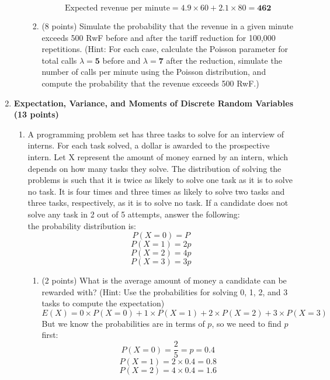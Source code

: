 \documentclass[a3paper,12pt]{article} %
\begin{document}
\begin{enumerate}
\begin{enumerate}
\begin{enumerate}
            \[
                \text{Expected revenue per minute} = 4.9 \times 60 + 2.1 \times 80 = \textbf{462}
            \]
            \item (8 points) Simulate the probability that the revenue in a given minute exceeds 500 RwF before and after the tariff reduction for 100,000 repetitions. (Hint: For each case, calculate the Poisson parameter for total calls \( \lambda = \textbf{5}\) before and \( \lambda = \textbf{7}\) after the reduction, simulate the number of calls per minute using the Poisson distribution, and compute the probability that the revenue exceeds 500 RwF.)
        \end{enumerate}
    \end{enumerate}
    \newpage
    \item \textbf{Expectation, Variance, and Moments of Discrete Random Variables (13 points)}
    \begin{enumerate}
        \item A programming problem set has three tasks to solve for an interview of interns. For each task solved, a dollar is awarded to the prospective intern. Let X represent the amount of money earned by an intern, which depends on how many tasks they solve. The distribution of solving the problems is such that it is twice as likely to solve one task as it is to solve no task. It is four times and three times as likely to solve two tasks and three tasks, respectively, as it is to solve no task. If a candidate does not solve any task in 2 out of 5 attempts, answer the following:
        \\ the probability distribution is:
        \[
            P(X = 0) = P
        \]
        \[
            P(X = 1) = 2p
        \]
        \[
        P(X = 2) = 4p
        \]
        \[
        P(X = 3) = 3p
        \]
        \begin{enumerate}
            \item (2 points) What is the average amount of money a candidate can be rewarded with? (Hint: Use the probabilities for solving 0, 1, 2, and 3 tasks to compute the expectation)
            \[
                E(X) = 0 \times P(X = 0) + 1 \times P(X = 1) + 2 \times P(X = 2) + 3 \times P(X = 3)
            \]
            But we know the probabilities are in terms of \( p \), so we need to find \( p \) first:
            \[
                P(X = 0) = \frac{2}{5} = p = 0.4
            \]
            \[
                P(X = 1) = 2 \times 0.4 = 0.8
            \]
            \[
                P(X = 2) = 4 \times 0.4 = 1.6
            \]

\end{enumerate}
\end{enumerate}
\end{enumerate}
\end{document}
